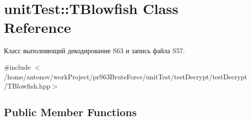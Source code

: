 \hypertarget{classunit_test_1_1_t_blowfish}{}\section{unit\+Test\+:\+:T\+Blowfish Class Reference}
\label{classunit_test_1_1_t_blowfish}


Класс выполняющий декодирование S63 и запись файла S57.  




{\ttfamily \#include $<$/home/antonov/work\+Project/pr\+S63\+Brute\+Force/unit\+Test/test\+Decrypt/test\+Decrypt/\+T\+Blowfish.\+hpp$>$}

\subsection*{Public Member Functions}
